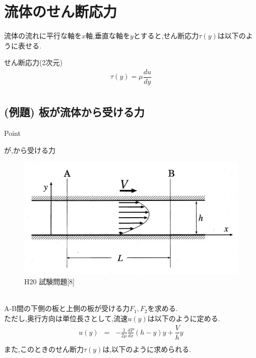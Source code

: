 \documentclass[a4paper]{jsarticle}
\begin{document}
\section{流体のせん断応力}
流体の流れに平行な軸を$x$軸,垂直な軸を$y$とすると,せん断応力$\tau\left(y\right)$は以下のように表せる.
\begin{itembox}[l]{せん断応力(2次元)}
    \begin{eqnarray*}
        \tau\left(y\right)=\mu\dfrac{du}{dy}\\
    \end{eqnarray*}
\end{itembox}

\subsection{(例題) 板が流体から受ける力}
\begin{itembox}[l]{Point}
    \begin{center}
        が,から受ける力
    \end{center}
\end{itembox}
\begin{figure}[htbp]
    \begin{center}
        \includegraphics[width=120mm]{images/ryuriki_image3.jpg}
        \caption{H20 試験問題[8]}
    \end{center}
\end{figure}
\\
A-B間の下側の板と上側の板が受ける力$F_1,F_2$を求める.\\
ただし,奥行方向は単位長さとして,流速$u\left(y\right)$は以下のように定める.
\begin{eqnarray*}
    u\left(y\right)&=&-\frac{1}{2\mu}\frac{dP}{dx}\left(h-y\right)y+\dfrac{V}{h}y\\
\end{eqnarray*}
また,このときのせん断力$\tau \left(y\right)$は,以下のように求められる.
\end{document}
